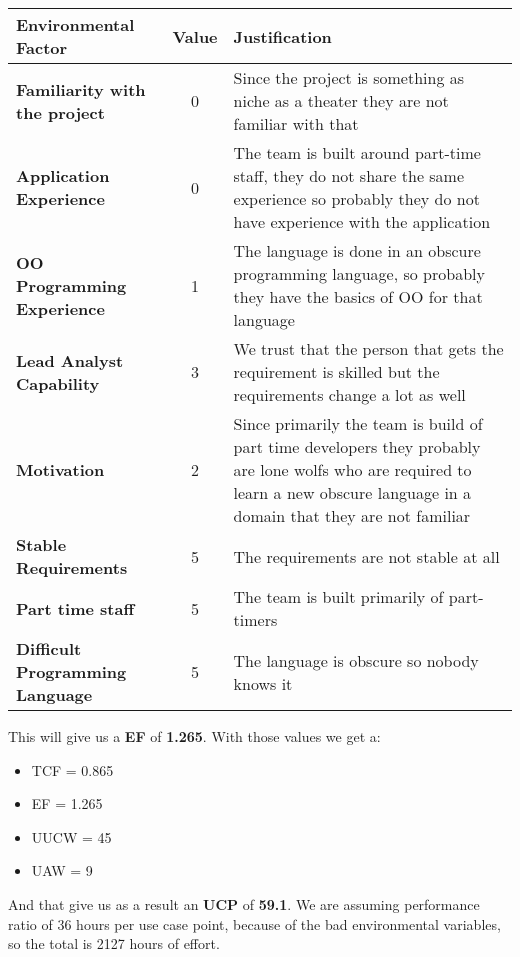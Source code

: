 \begin{center}
    \begin{tabular}{|l | c | p{7cm}|} 
        \hline
        \textbf{Environmental Factor} & \textbf{Value} & \textbf{Justification} \\ [0.5ex] 
        \hline
        \textbf{Familiarity with the project} & 0 & Since the project is something as niche as a theater they are not familiar with that\\
        \hline
        \textbf{Application Experience} &0 & The team is built around part-time staff, they do not share the same experience so probably they do not have experience with the application   \\
        \hline
        \textbf{OO Programming Experience}&1 & The language is done in an obscure programming language, so probably they have the basics of OO for that language \\
        \hline
        \textbf{Lead Analyst Capability} &3 &We trust that the person that gets the requirement is skilled but the requirements change a lot as well \\
        \hline
        \textbf{Motivation} &2 & Since primarily the team is build of part time developers they probably are lone wolfs who are required to learn a new obscure language in a domain that they are not familiar \\
        \hline
        \textbf{Stable Requirements}&5 & The requirements are not stable at all \\
        \hline
        \textbf{Part time staff}& 5 &  The team is built primarily of part-timers \\
        \hline
        \textbf{Difficult Programming Language}&5 & The language is obscure so nobody knows it\\
        \hline
    \end{tabular}
\end{center}
\noindent
This will give us a \textbf{EF} of \textbf{1.265}. With those values we get a:
\begin{itemize}
    \item TCF = 0.865
    \item EF = 1.265
    \item UUCW = 45
    \item UAW = 9
\end{itemize}
\noindent
And that give us as a result an \textbf{UCP} of \textbf{59.1}. \newline\newline
\noindent
We are assuming performance ratio of 36 hours per use case point, because of the bad environmental variables, so the total is 2127 hours of effort.